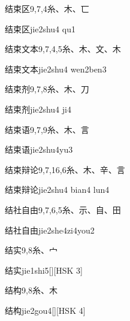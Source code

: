 \begin{entry}{结束区}{9,7,4}{⽷、⽊、⼖}
  \begin{phonetics}{结束区}{jie2shu4 qu1}
  \end{phonetics}
\end{entry}

\begin{entry}{结束文本}{9,7,4,5}{⽷、⽊、⽂、⽊}
  \begin{phonetics}{结束文本}{jie2shu4 wen2ben3}
  \end{phonetics}
\end{entry}

\begin{entry}{结束剂}{9,7,8}{⽷、⽊、⼑}
  \begin{phonetics}{结束剂}{jie2shu4 ji4}
  \end{phonetics}
\end{entry}

\begin{entry}{结束语}{9,7,9}{⽷、⽊、⾔}
  \begin{phonetics}{结束语}{jie2shu4yu3}
  \end{phonetics}
\end{entry}

\begin{entry}{结束辩论}{9,7,16,6}{⽷、⽊、⾟、⾔}
  \begin{phonetics}{结束辩论}{jie2shu4 bian4 lun4}
  \end{phonetics}
\end{entry}

\begin{entry}{结社自由}{9,7,6,5}{⽷、⽰、⾃、⽥}
  \begin{phonetics}{结社自由}{jie2she4zi4you2}
  \end{phonetics}
\end{entry}

\begin{entry}{结实}{9,8}{⽷、⼧}
  \begin{phonetics}{结实}{jie1shi5}[][HSK 3]
  \end{phonetics}
\end{entry}

\begin{entry}{结构}{9,8}{⽷、⽊}
  \begin{phonetics}{结构}{jie2gou4}[][HSK 4]
  \end{phonetics}
\end{entry}

